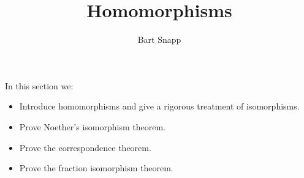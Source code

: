 \documentclass{ximera}
\author{Bart Snapp}
\title{Homomorphisms}
\begin{document}
\begin{abstract}
\end{abstract}
\maketitle
In this section we:

\begin{itemize}
\item Introduce homomorphisms and give a rigorous treatment of
  isomorphisms.
\item Prove Noether's isomorphism theorem.
\item Prove the correspondence theorem.
\item Prove the fraction isomorphism theorem.
\end{itemize}
\end{document}
